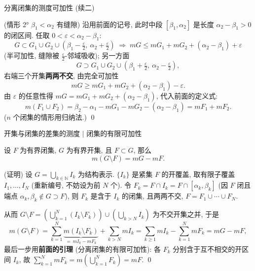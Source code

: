 
\begin{frame}{分离闭集的测度可加性 (续二)}

\startproof[bg=yellow, fg=red](情形 2° $\beta_1 < \alpha_2$ 有缝隙)
沿用前面的记号, 此时中段 $[\beta_1, \alpha_2]$ 是长度 $\alpha_2 - \beta_1 > 0$ 的闭区间. 任取 $0 < \varepsilon < \alpha_2 - \beta_1$:
\[
G \subset G_1 \cup G_2 \cup (\beta_1 - \tfrac{\varepsilon}{2},\ \alpha_2 + \tfrac{\varepsilon}{2})
\;\Longrightarrow\;
m G \leqslant m G_1 + m G_2 + (\alpha_2 - \beta_1) + \varepsilon
\]
(半可加性, 缝隙被 $\frac{\varepsilon}{2}$-邻域吸收); 另一方面
\[
G \supset G_1 \cup G_2 \cup (\beta_1 + \tfrac{\varepsilon}{2},\ \alpha_2 - \tfrac{\varepsilon}{2}),
\]
右端三个开集\textbf{两两不交}, 由完全可加性
\[
m G \geqslant m G_1 + m G_2 + (\alpha_2 - \beta_1) - \varepsilon .
\]
由 $\varepsilon$ 的任意性得 $m G = m G_1 + m G_2 + (\alpha_2 - \beta_1)$, 代入前面的定义式:
\[
m (F_1 \cup F_2) = \beta_2 - \alpha_1 - m G_1 - m G_2 - (\alpha_2 - \beta_1) = m F_1 + m F_2 .
\]
($n$ 个闭集的情形用归纳法.)
\qed

\end{frame}


\begin{frame}{开集与闭集的差集的测度 \texorpdfstring{$|$}{|} 闭集的有限可加性}

\begin{thm}[开集与闭集的差集的测度]
设 $F$ 为有界闭集, $G$ 为有界开集, 且 $F \subset G$, 那么
\[
m (G \setminus F) = m G - m F .
\]
\end{thm}

\pause

\startproof[bg=yellow, fg=red](证明)
设 $G = \bigcup_{k \in \mathbb{N}} I_k$ 为结构表示. $\{I_k\}$ 是紧集 $F$ 的开覆盖, 取有限子覆盖 $I_1, \ldots, I_N$ (重新编号, 不妨设为前 $N$ 个). 令 $F_k = F \cap I_k = F \cap [\alpha_k, \beta_k]$ (因 $F$ 闭且端点 $\alpha_k, \beta_k \notin G \supset F$), 则 $F_k$ 是含于 $I_k$ 的闭集, 且两两不交, $F = F_1 \cup \cdots \cup F_N$.

\pause

从而 $G \setminus F = \left(\bigcup_{k=1}^N (I_k \setminus F_k)\right) \cup \left(\bigcup_{k > N} I_k\right)$ 为\alert{不交开集之并}, 于是
\[
m (G \setminus F)
= \sum_{k=1}^N \underbrace{m (I_k \setminus F_k)}_{= \,m I_k - m F_k} + \sum_{k > N} m I_k
= \sum_{k \geqslant 1} m I_k - \sum_{k=1}^N m F_k
= m G - m F ,
\]
最后一步用\textbf{前面的引理} (分离闭集的有限可加性): 各 $F_k$ 分别含于互不相交的开区间 $I_k$, 故
$\sum_{k=1}^N m F_k = m\left(\bigcup_{k=1}^N F_k\right) = m F$.
\qed

\end{frame}


